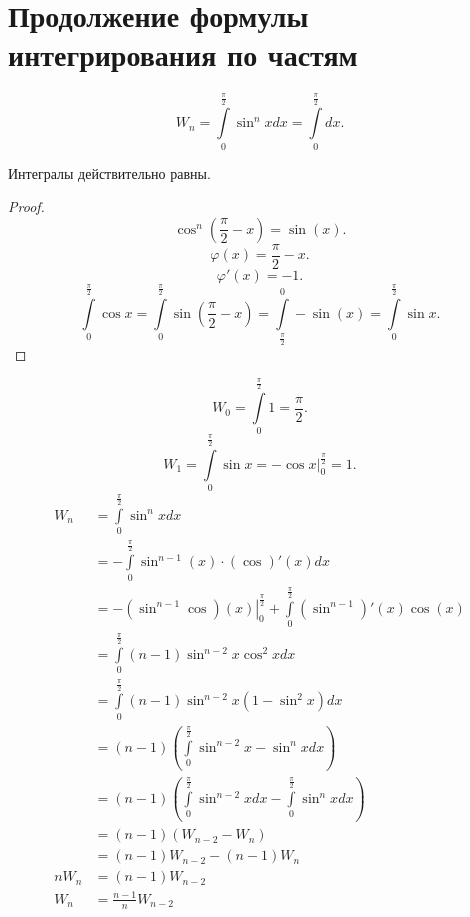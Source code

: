\documentclass[11pt, oneside]{article}   	%
\begin{document}
\section{Продолжение формулы интегрирования по частям}
\begin{definition}
    \[ W_n = \int\limits_{0}^{\frac{\pi}{2}} \sin^{n} x dx = \int\limits_{0}^{\frac{\pi}{2}} dx .\]
\end{definition}
\begin{dlemma}
    Интегралы действительно равны.
    \begin{proof}
        \[ \cos^{n}(\frac{\pi}{2}-x) = \sin(x) .\]
        \[ \varphi(x) = \frac{\pi}{2}-x .\]
        \[ \varphi'(x) = -1 .\]
        \[ \int\limits_{0}^{\frac{\pi}{2}} \cos x = \int\limits_{0}^{\frac{\pi}{2}} \sin(\frac{\pi}{2}-x) = \int\limits_{\frac{\pi}{2}}^{0} -\sin(x) = \int\limits_{0}^{\frac{\pi}{2}} \sin x       .\] 
    \end{proof}
\end{dlemma}
\begin{dlemma}
    \[ W_0 = \int\limits_{0}^{\frac{\pi}{2}} 1 = \frac{\pi}{2}  .\]
    \[ W_1 = \int\limits_{0}^{\frac{\pi}{2}} \sin x = \left. -\cos x\right|_{0}^{\frac{\pi}{2}} = 1   .\]
        \begin{equation*}
            \begin{split}
                W_{n} &= \int\limits_{0}^{\frac{\pi}{2}} \sin^{n} x dx \\
                      &= -\int\limits_{0}^{\frac{\pi}{2}} \sin^{n-1}(x) \cdot (\cos)'(x) dx \\
                      &= -\left.(\sin^{n-1}\cos)(x)\right|_{0}^{\frac{\pi}{2}} + \int\limits_{0}^{\frac{\pi}{2}} (\sin^{n-1})'(x) \cos (x)\\ 
                      &= \int\limits_{0}^{\frac{\pi}{2}} (n-1)\sin^{n-2}x\cos^2 x dx\\
                      &= \int\limits_{0}^{\frac{\pi}{2}} (n-1)\sin^{n-2}x(1-\sin^2 x)dx\\
                      &= (n-1)\left( \int\limits_{0}^{\frac{\pi}{2}}\sin^{n-2} x -\sin^{n} x dx  \right)\\
                      &= (n-1)\left(\int\limits_{0}^{\frac{\pi}{2}} \sin^{n-2}xdx - \int\limits_{0}^{\frac{\pi}{2}}\sin^{n} xdx \right)\\
                      &= (n-1)\left( W_{n-2} - W_n \right)\\
                      &= (n-1)W_{n-2} - (n-1)W_{n}\\
                 nW_n &= (n-1)W_{n-2}\\
                  W_n &= \frac{n-1}{n}W_{n-2}
            \end{split}
        \end{equation*}
\end{dlemma}
\end{document}
